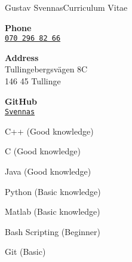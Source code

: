 \documentclass{article}
\begin{document}
\begin{cv}{Gustav Svennas}{Curriculum Vitae}
\cvseparator[3]
\begin{cvitem}[Phone][4]
    \textbf{Phone}\\
    \href{tel:+46702968266}{\texttt{070 296 82 66}}
\end{cvitem}

\cvseparator[3]
\begin{cvitem}[Home][4]
    \textbf{Address}\\
    Tullingebergsvägen 8C\\ 146 45 Tullinge
\end{cvitem}

\cvseparator[3]
\begin{cvitem}[Globe][4]
    \textbf{GitHub}\\
    \href{https://github.com/Svennas}{\texttt{Svennas}}
\end{cvitem}




\begin{cvitem}
    C++ (Good knowledge)
\end{cvitem}

\begin{cvitem}
    C (Good knowledge)
\end{cvitem}

\begin{cvitem}
    Java (Good knowledge)
\end{cvitem}

\begin{cvitem}
    Python (Basic knowledge)
\end{cvitem}

\cvseparator
\begin{cvitem}
    Matlab (Basic knowledge)
\end{cvitem}

\cvseparator
\begin{cvitem}
    Bash Scripting (Beginner)
\end{cvitem}


\cvseparator
\begin{cvitem}
    Git (Basic)
\end{cvitem}




\end{cv}
\end{document}
